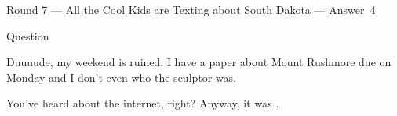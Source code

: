 \documentclass[11pt]{beamer}
\begin{document}
\begin{frame}[t]{Round 7 --- All the Cool Kids are Texting about South Dakota --- \mbox{Answer 4}}
\begin{block}{Question}

\begin{minipage}{0.9\textwidth}
\begin{mdframed}[
    roundcorner=7pt,
    backgroundcolor=black!5,
    linecolor=black!5,
    fontcolor=black,
    ignorelastdescenders]
\begin{flushleft}
{\small{}\selectfont{}
Duuuude, my weekend is ruined.  I have a paper about Mount Rushmore due on Monday and I don't even who the sculptor was.
}
\end{flushleft}
\end{mdframed}
\end{minipage}

\hfill{}\begin{minipage}{0.9\textwidth}
\begin{mdframed}[
    roundcorner=7pt,
    backgroundcolor=blue!80!white,
    linecolor=blue!80!white,
    fontcolor=white,
    ignorelastdescenders]
\begin{flushleft}
{\small{}\selectfont{}
You've heard about the internet, right? Anyway, it was \textunderscore{}\textunderscore{}\textunderscore{}\textunderscore{}\textunderscore{}\textunderscore{} \textunderscore{}\textunderscore{}\textunderscore{}\textunderscore{}\textunderscore{}\textunderscore{}.
}
\end{flushleft}
\end{mdframed}
\end{minipage}
\end{block}
\end{frame}
\end{document}
